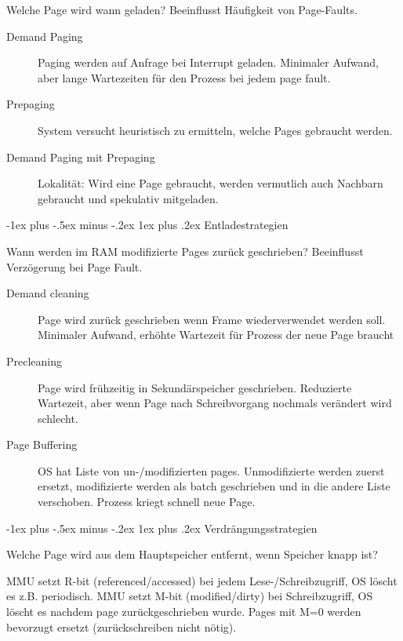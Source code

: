 \documentclass[10pt,landscape,a4paper]{article}
\makeatletter
\renewcommand{\subsubsection}{\@startsection{subsubsection}{3}{0mm}%
                                {-1ex plus -.5ex minus -.2ex}%
                                {1ex plus .2ex}%
                                {\normalfont\footnotesize\bfseries}}
\makeatother
\begin{document}
\begin{multicols*}{3}
Welche Page wird wann geladen? Beeinflusst Häufigkeit von Page-Faults.

\begin{description}
\item[Demand Paging] Paging werden auf Anfrage bei Interrupt geladen. Minimaler
  Aufwand, aber lange Wartezeiten für den Prozess bei jedem page fault.
\item[Prepaging] System versucht heuristisch zu ermitteln, welche Pages
  gebraucht werden.
\item[Demand Paging mit Prepaging] Lokalität: Wird eine Page gebraucht, werden
  vermutlich auch Nachbarn gebraucht und spekulativ mitgeladen.
\end{description}

\subsubsection{Entladestrategien}

Wann werden im RAM modifizierte Pages zurück geschrieben? Beeinflusst
Verzögerung bei Page Fault.

\begin{description}
\item[Demand cleaning] Page wird zurück geschrieben wenn Frame wiederverwendet
  werden soll. Minimaler Aufwand, erhöhte Wartezeit für Prozess der neue Page
  braucht
\item[Precleaning] Page wird frühzeitig in Sekundärspeicher geschrieben.
  Reduzierte Wartezeit, aber wenn Page nach Schreibvorgang nochmals verändert
  wird schlecht.
\item[Page Buffering] OS hat Liste von un-/modifizierten pages. Unmodifizierte
  werden zuerst ersetzt, modifizierte werden als batch geschrieben und in die
  andere Liste verschoben. Prozess kriegt schnell neue Page.
\end{description}

\subsubsection{Verdrängungsstrategien}

Welche Page wird aus dem Hauptspeicher entfernt, wenn Speicher knapp ist?

MMU setzt R-bit (referenced/accessed) bei jedem Lese-/Schreibzugriff, OS löscht
es z.B. periodisch. MMU setzt M-bit (modified/dirty) bei Schreibzugriff, OS
löscht es nachdem page zurückgeschrieben wurde. Pages mit M=0 werden bevorzugt
ersetzt (zurückschreiben nicht nötig).


\end{multicols*}
\end{document}
